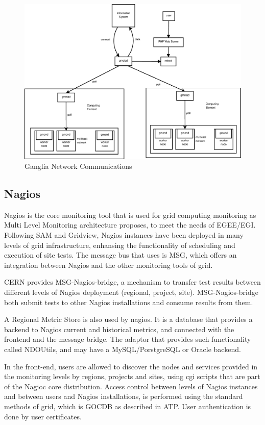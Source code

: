 \begin{figure}[htb]
\centering
 \includegraphics[width=6in]{images/ganglia_data_flow.eps}
\caption{Ganglia Network Communications}
\label{figure:ganglia_network}
\end{figure}



\subsection{Nagios}

Nagios is the core monitoring tool that is used for grid computing monitoring as Multi Level Monitoring architecture proposes, to meet the needs of EGEE/EGI. Following SAM and Gridview, Nagios instances have been deployed in many levels of grid infrastructure, enhansing the functionality of scheduling and execution of site tests. The message bus that uses is MSG, which offers an integration between Nagios and the other monitoring tools of grid.

CERN provides MSG-Nagios-bridge, a mechanism to transfer test results between different levels of Nagios deployment (regional, project, site). MSG-Nagios-bridge both submit tests to other Nagios installations and consume results from them. 

A Regional Metric Store is also used by nagios. It is a database that provides a backend to Nagios current and historical metrics, and connected with the frontend and the message bridge. The adaptor that provides such functionality called NDOUtils, and may have a MySQL/PorstgreSQL or Oracle backend.

In the front-end, users are allowed to discover the nodes and services provided in the monitoring levels by regions, projects and sites, using cgi scripts that are part of the Nagioc core distribution. Access control between levels of Nagios instances and between users and Nagios installations, is performed using the standard methods of grid, which is GOCDB as described in ATP. User authentication is done by user certificates.

